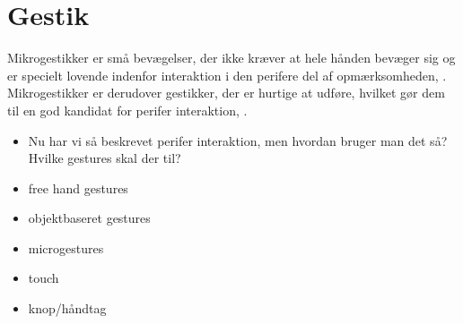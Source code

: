 \section{Gestik}
\label{Gestik}


Mikrogestikker er små bevægelser, der ikke kræver at hele hånden bevæger sig og er specielt lovende indenfor interaktion i den perifere del af opmærksomheden, \parencite[s. 95]{PDF:PeripheralInteraction}. Mikrogestikker er derudover gestikker, der er hurtige at udføre, hvilket gør dem til en god kandidat for perifer interaktion, \parencite[s. 96]{PDF:PeripheralInteraction}. 


\begin{itemize}
	\item Nu har vi så beskrevet perifer interaktion, men hvordan bruger man det så? Hvilke gestures skal der til?
	\item free hand gestures
	\item objektbaseret gestures
	\item microgestures
	\item touch
	\item knop/håndtag 
\end{itemize}
